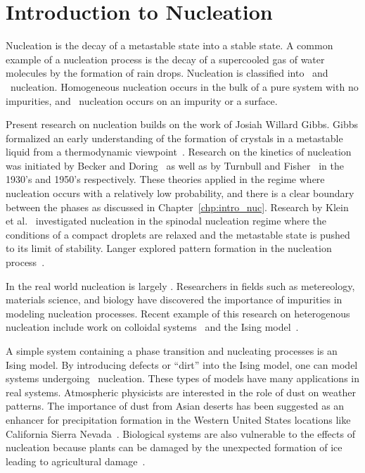 
\chapter{\label{chp:intro_nuc}Introduction to Nucleation}

Nucleation is the decay of a metastable state into a stable state. A common example of a nucleation process is the decay of a supercooled gas of water molecules by the formation of rain drops. Nucleation is classified into \homo\ and \het\ nucleation. Homogeneous nucleation occurs in the bulk of a pure system with no impurities, and \het\ nucleation occurs on an impurity or a surface.

Present research on nucleation builds on the work of Josiah Willard Gibbs. Gibbs formalized an early understanding of the formation of crystals in a metastable liquid from a thermodynamic viewpoint~\cite{gibbs}. Research on the kinetics of nucleation was initiated by Becker and Doring~\cite{Becker} as well as by Turnbull and Fisher~\cite{Turnbull} in the 1930's and 1950's respectively. These theories applied in the regime where nucleation occurs with a relatively low probability, and there is a clear boundary between the phases as  discussed in   Chapter~\ref{chp:intro_nuc}. Research by Klein et al.~\cite{klein07} investigated nucleation in the spinodal nucleation regime where the conditions of a compact droplets are relaxed and the metastable state is pushed to its limit of stability. Langer explored pattern formation in the nucleation process~\cite{Langer}. 

In the real world nucleation is largely \het. Researchers in fields such as metereology, materials science, and biology have discovered the importance of impurities in modeling nucleation processes. Recent example of this research on heterogenous nucleation include work on colloidal systems~\cite{engel11} and the Ising model~\cite{sear12}.  

A simple  system  containing a phase transition and nucleating processes is an Ising model. By introducing defects or ``dirt'' into the Ising model, one can model systems undergoing \het\ nucleation. These types of models have many applications in real systems. Atmospheric physicists are interested in the role of dust on weather patterns. The importance of dust from Asian deserts has been suggested as an enhancer for precipitation formation in the Western United States locations like  California Sierra Nevada~\cite{prather13,kulmala13}. Biological systems are also vulnerable to the effects of nucleation because plants can be damaged by the unexpected formation of ice leading to agricultural damage~\cite{kalik12}.

